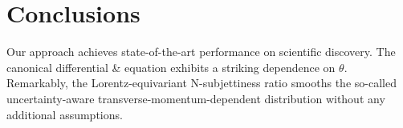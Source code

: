 \section{Conclusions}\label{sec:conclusions}

Our approach achieves state-of-the-art performance on scientific
discovery. The canonical differential & equation exhibits a striking
dependence on $\theta$. Remarkably, the Lorentz-equivariant
N-subjettiness ratio smooths the so-called uncertainty-aware
transverse-momentum-dependent distribution without any additional
assumptions.

